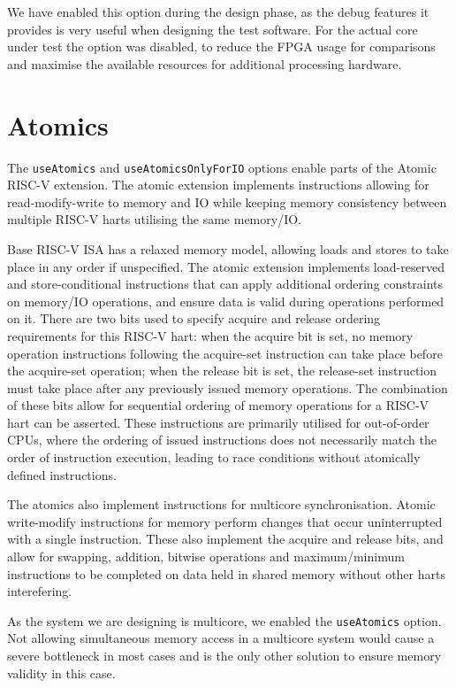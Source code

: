 We have enabled this option during the design phase, as the debug features it provides is very useful when designing the test software. For the actual core under test the option was disabled, to reduce the FPGA usage for comparisons and maximise the available resources for additional processing hardware.

\section{Atomics}
The \texttt{useAtomics} and \texttt{useAtomicsOnlyForIO} options enable parts of the Atomic RISC-V extension. The atomic extension implements instructions allowing for read-modify-write to memory and IO while keeping memory consistency between multiple RISC-V harts utilising the same memory/IO.

Base RISC-V ISA has a relaxed memory model, allowing loads and stores to take place in any order if unspecified. The atomic extension implements load-reserved and store-conditional instructions that can apply additional ordering constraints on memory/IO operations, and ensure data is valid during operations performed on it. There are two bits used to specify acquire and release ordering requirements for this RISC-V hart: when the acquire bit is set, no memory operation instructions following the acquire-set instruction can take place before the acquire-set operation; when the release bit is set, the release-set instruction must take place after any previously issued memory operations. The combination of these bits allow for sequential ordering of memory operations for a RISC-V hart can be asserted. These instructions are primarily utilised for out-of-order CPUs, where the ordering of issued instructions does not necessarily match the order of instruction execution, leading to race conditions without atomically defined instructions.

The atomics also implement instructions for multicore synchronisation. Atomic write-modify instructions for memory perform changes that occur uninterrupted with a single instruction. These also implement the acquire and release bits, and allow for swapping, addition, bitwise operations and maximum/minimum instructions to be completed on data held in shared memory without other harts interefering.

As the system we are designing is multicore, we enabled the \texttt{useAtomics} option. Not allowing simultaneous memory access in a multicore system would cause a severe bottleneck in most cases and is the only other solution to ensure memory validity in this case.

